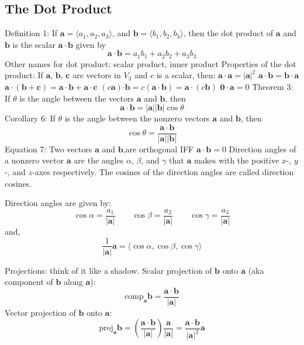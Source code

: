 \documentclass{article}
\begin{document}
    \subsection{The Dot Product}
    \begin{outline}
        \1 Definition 1: If \(\mathbf a=\langle a_1,a_2,a_3\rangle\), and \(\mathbf b=\langle b_1,b_2,b_3\rangle\), then the dot product of \(\mathbf a\) and \(\mathbf b\) is the scalar \(\mathbf{a\cdot b}\) given by \[\mathbf{a\cdot b}=a_1b_1+a_2b_2+a_3b_3\]
        \1 Other names for dot product: scalar product, inner product
        \1 Properties of the dot product: If \(\mathbf a\), \(\mathbf b\), \(\mathbf c\) are vectors in \(V_3\) and $c$ is a scalar, then: 
            \2 \(\mathbf{a\cdot a}=|\mathbf a|^2\)
            \2 \(\mathbf{a\cdot b}=\mathbf{b\cdot a}\)
            \2 \(\mathbf{a\cdot}(\mathbf{b+c})=\mathbf{a\cdot b+a\cdot c}\)
            \2 \((c\mathbf a)\mathbf{\cdot b}=c(\mathbf{a\cdot b})=\mathbf{a\cdot}(c\mathbf b)\)
            \2 \(\mathbf{0\cdot a}=0\)
        \1 Theorem 3: If \(\theta\) is the angle between the vectors \(\mathbf a\) and \(\mathbf b\), then \[\mathbf{a\cdot b}=|\mathbf a||\mathbf b|\cos\theta\]
        \1 Corollary 6: If \(\theta\) is the angle between the nonzero vectors \(\mathbf a\) and \(\mathbf b\), then \[\cos\theta=\dfrac{\mathbf{a\cdot b}}{|\mathbf a||\mathbf b|}\]
        \1 Equation 7: Two vectors \(\mathbf a\) and \(\mathbf b\),are orthogonal IFF \(\mathbf{a\cdot b}=0\)
        \1 Direction angles of a nonzero vector \(\mathbf a\) are the angles \(\alpha\), \(\beta\), and \(\gamma\) that \(\mathbf a\) makes with the positive \(x\)-, \(y\)-, and \(z\)-axes respectively. The cosines of the direction angles are called direction cosines. 
    \end{outline}
    \begin{outline}
        \1 Direction angles are given by: \[\cos\alpha=\dfrac{a_1}{|\mathbf a|}\qquad\cos\beta=\dfrac{a_2}{|\mathbf a|}\qquad\cos\gamma=\dfrac{a_3}{|\mathbf a|}\] and, \[\dfrac{1}{|\mathbf a|}\mathbf a=\langle\cos\alpha,\cos\beta,\cos\gamma\rangle\]
    \end{outline}\begin{outline}
        \1 Projections: think of it like a shadow. 
        \1 Scalar projection of \(\mathbf b\) onto \(\mathbf a\) (aka component of \(\mathbf b\) along \(\mathbf{a}\)): \[\text{comp}_{\mathbf a}\mathbf b=\dfrac{\mathbf{a\cdot b}}{|\mathbf a|}\]
        \1 Vector projection of \(\mathbf b\) onto \(\mathbf a\): \[\text{proj}_{\mathbf a}\mathbf b=\left(\dfrac{\mathbf{a\cdot b}}{|\mathbf a|}\right)\dfrac{\mathbf a}{|\mathbf a|}=\dfrac{\mathbf{a\cdot b}}{|\mathbf a|^2}\mathbf a\]

    \end{outline} 
\end{document}
